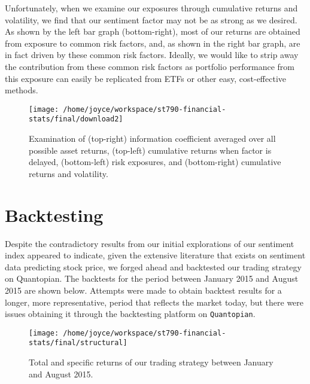 \documentclass[11pt,]{article}
\begin{document}
Unfortunately, when we examine our exposures through cumulative returns
and volatility, we find that our sentiment factor may not be as strong
as we desired. As shown by the left bar graph (bottom-right), most of
our returns are obtained from exposure to common risk factors, and, as
shown in the right bar graph, are in fact driven by these common risk
factors. Ideally, we would like to strip away the contribution from
these common risk factors as portfolio performance from this exposure
can easily be replicated from ETFs or other easy, cost-effective
methods.

\begin{figure}

{\centering \texttt{[image: /home/joyce/workspace/st790-financial-stats/final/download2]} 

}

\caption{Examination of (top-right) information coefficient averaged over all possible asset returns, (top-left) cumulative returns when factor is delayed, (bottom-left) risk exposures, and (bottom-right) cumulative returns and volatility.}\label{fig:unnamed-chunk-2}
\end{figure}

\newpage 

\section{Backtesting}\label{backtesting}

Despite the contradictory results from our initial explorations of our
sentiment index appeared to indicate, given the extensive literature
that exists on sentiment data predicting stock price, we forged ahead
and backtested our trading strategy on Quantopian. The backtests for the
period between January 2015 and August 2015 are shown below. Attempts
were made to obtain backtest results for a longer, more representative,
period that reflects the market today, but there were issues obtaining
it through the backtesting platform on \texttt{Quantopian}.

\begin{figure}

{\centering \texttt{[image: /home/joyce/workspace/st790-financial-stats/final/structural]} 

}

\caption{Total and specific returns of our trading strategy between January and August 2015.}\label{fig:unnamed-chunk-3}
\end{figure}
\end{document}
